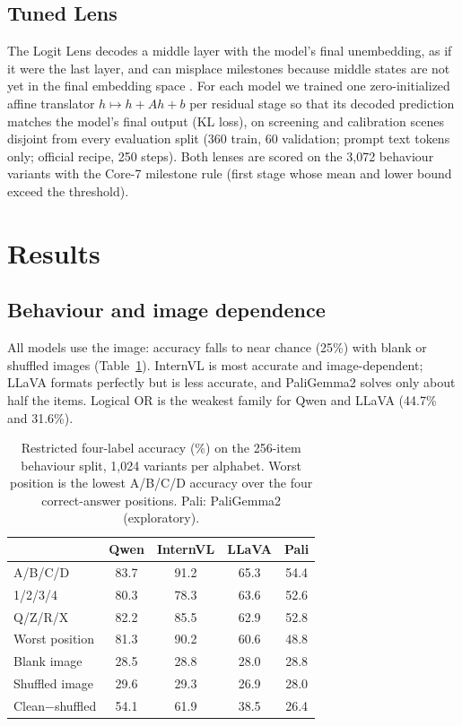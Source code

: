 \documentclass[11pt]{article}
\begin{document}
\subsection{Tuned Lens}

The Logit Lens decodes a middle layer with the model's final unembedding, as if it were the last layer, and can misplace milestones because middle states are not yet in the final embedding space \citep{belrose2023tunedlens}. For each model we trained one zero-initialized affine translator $h \mapsto h + Ah + b$ per residual stage so that its decoded prediction matches the model's final output (KL loss), on screening and calibration scenes disjoint from every evaluation split (360 train, 60 validation; prompt text tokens only; official recipe, 250 steps). Both lenses are scored on the 3,072 behaviour variants with the Core-7 milestone rule (first stage whose mean and lower bound exceed the threshold).

\section{Results}

\subsection{Behaviour and image dependence}

All models use the image: accuracy falls to near chance (25\%) with blank or shuffled images (Table~\ref{tab:behaviour}). InternVL is most accurate and image-dependent; LLaVA formats perfectly but is less accurate, and PaliGemma2 solves only about half the items. Logical OR is the weakest family for Qwen and LLaVA (44.7\% and 31.6\%).

\begin{table}[t]
\centering
\footnotesize
\setlength{\tabcolsep}{3pt}
\begin{tabularx}{\columnwidth}{@{}X*{4}{c}@{}}
\toprule
 & Qwen & InternVL & LLaVA & Pali \\
\midrule
A/B/C/D & 83.7 & 91.2 & 65.3 & 54.4 \\
1/2/3/4 & 80.3 & 78.3 & 63.6 & 52.6 \\
Q/Z/R/X & 82.2 & 85.5 & 62.9 & 52.8 \\
Worst position & 81.3 & 90.2 & 60.6 & 48.8 \\
Blank image & 28.5 & 28.8 & 28.0 & 28.8 \\
Shuffled image & 29.6 & 29.3 & 26.9 & 28.0 \\
Clean$-$shuffled & 54.1 & 61.9 & 38.5 & 26.4 \\
\bottomrule
\end{tabularx}
\caption{Restricted four-label accuracy (\%) on the 256-item behaviour split, 1,024 variants per alphabet. Worst position is the lowest A/B/C/D accuracy over the four correct-answer positions. Pali: PaliGemma2 (exploratory).}
\label{tab:behaviour}
\end{table}
\end{document}
